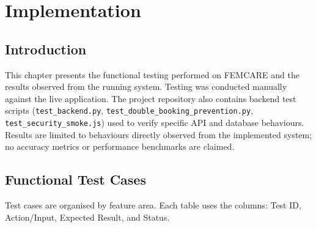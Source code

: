 
\chapter{Implementation}\doublespacing
\label{chap:testing}

\section{Introduction}
\label{sec:test-intro}

This chapter presents the functional testing performed on FEMCARE and the results observed from the running system. Testing was conducted manually against the live application. The project repository also contains backend test scripts (\texttt{test\_backend.py}, \texttt{test\_double\_booking\_prevention.py}, \texttt{test\_security\_smoke.js}) used to verify specific API and database behaviours. Results are limited to behaviours directly observed from the implemented system; no accuracy metrics or performance benchmarks are claimed.

\section{Functional Test Cases}
\label{sec:test-functional}

Test cases are organised by feature area. Each table uses the columns: Test ID, Action/Input, Expected Result, and Status.


